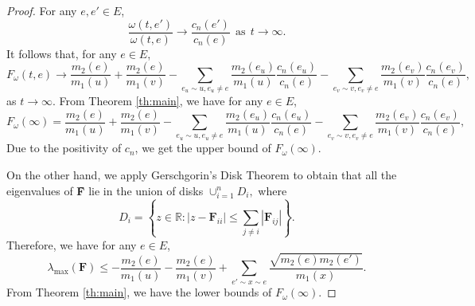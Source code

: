 \documentclass{article}
\begin{document}
\begin{proof}

For any $e,e'\in E$,
\[\frac{\omega(t,e')}{\omega(t,e)}\rightarrow \frac{c_{n}(e')}{c_{n}(e)}~~\mbox{as}~~t\rightarrow \infty.\]
It follows that, for any $e\in E$,
\begin{equation*}
  F_{\omega}(t,e)\rightarrow\frac{m_2(e)}{m_1(u)}+\frac{m_2(e)}{m_1(v)}-\sum_{e_u\sim u,e_u\neq e}\frac{m_2(e_u)}{m_1(u)}\frac{c_{n}(e_u)}{c_{n}(e)}-\sum_{e_v\sim v,e_v\neq e}\frac{m_2(e_v)}{m_1(v)}\frac{c_{n}(e_v)}{c_{n}(e)},
\end{equation*}
as $t\rightarrow \infty$.
From Theorem \ref{th:main}, we have for any $e\in E$,
\[F_\omega(\infty)=\frac{m_2(e)}{m_1(u)}+\frac{m_2(e)}{m_1(v)}-\sum_{e_u\sim u,e_u\neq e}\frac{m_2(e_u)}{m_1(u)}\frac{c_{n}(e_u)}{c_{n}(e)}-\sum_{e_v\sim v,e_v\neq e}\frac{m_2(e_v)}{m_1(v)}\frac{c_{n}(e_v)}{c_{n}(e)},\]
Due to the positivity of $c_{n}$, we get the upper bound of $F_\omega(\infty)$.

On the other hand, we apply Gerschgorin's Disk Theorem to obtain that all the eigenvalues of {\textbf{\~{F}}} lie in the union of disks
$\cup_{i=1}^nD_i,$
where
    \[ D_i = \left\{ z \in \mathbb{R} : |z-{\textbf{\~{F}}}_{ii}| \leq \sum_{j \neq i} |{\textbf{\~{F}}}_{ij}| \right\}.\]
Therefore,  we have for any $e\in E$,
\[\lambda_{\max}({\textbf{\~{F}}})\leq -\frac{m_2(e)}{m_1(u)}-\frac{m_2(e)}{m_1(v)}+\sum_{e'\sim x\sim e}\frac{\sqrt{m_2(e)m_2(e')}}{m_1(x)}.\]
From Theorem \ref{th:main}, we have the lower bounds of $F_\omega(\infty)$. 
\end{proof}
\end{document}
